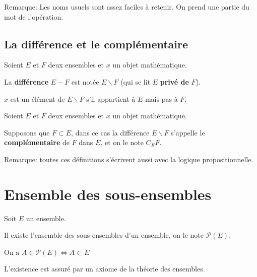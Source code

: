 \documentclass{article}
\begin{document}
Remarque: Les noms usuels sont assez faciles à retenir. On prend une partie du mot de l'opération.



\subsection{La différence et le complémentaire}

\begin{tcolorbox}[colback=red!5!white,colframe=red!75!black,title=Définition 2.5]

Soient $E$ et $F$ deux ensembles et $x$ un objet mathématique. 

La \textbf{différence} $E - F$ est notée $E \backslash F$ (qui se lit $E$ \textbf{privé de} $F$).

$x$ est un élément de $E \backslash F$ s'il appartient à $E$ mais pas à $F$.


\end{tcolorbox}


\begin{tcolorbox}[colback=red!5!white,colframe=red!75!black,title=Définition 2.6]

Soient $E$ et $F$ deux ensembles et $x$ un objet mathématique. 

Supposons que $F \subset E$, dans ce cas la différence $E \backslash F$ s'appelle le \textbf{complémentaire} de $F$ dans $E$, et on le note $C_{E} F$.



\end{tcolorbox}

Remarque: toutes ces définitions s'écrivent aussi avec la logique propositionnelle.

\section{Ensemble des sous-ensembles}

\begin{tcolorbox}[colback=red!5!white,colframe=red!75!black,title=Définition 2.7]

Soit $E$ un ensemble. 

Il existe l'ensemble des sous-ensembles d'un ensemble, on le note $\mathcal{P}(E)$. 

On a $A \in \mathcal{P}(E) \iff A \subset E$

\tcblower

L'existence est assuré par un axiome de la théorie des ensembles.

\end{tcolorbox}
\end{document}
